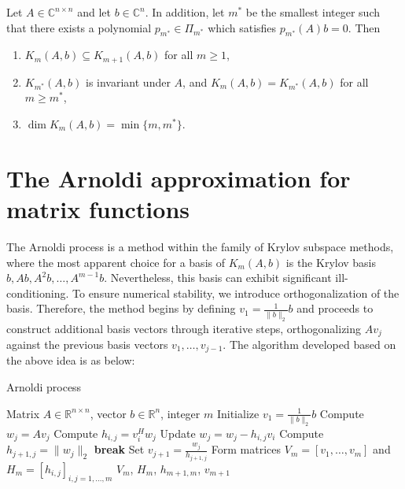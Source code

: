 \begin{remark}
    \label{rem:2.14}
    \cite{37}Let $A \in \mathbb{C}^{n \times n}$ and let $b \in \mathbb{C}^n$. In addition, let $m^*$ be the smallest integer such that there exists a polynomial $p_{m^*} \in \Pi_{m^*}$ which satisfies $p_{m^*}(A)b = 0$. Then
    \begin{enumerate}
        \item $K_m(A,b) \subseteq K_{m+1}(A,b)$ for all $m \geq 1$,
        \item $K_{m^*}(A,b)$ is invariant under $A$, and $K_m(A,b) = K_{m^*}(A,b)$ for all $m \geq m^*$,
        \item $\dim K_m(A,b) = \min\{m, m^*\}$.
    \end{enumerate}

\end{remark}

\section{The Arnoldi approximation for matrix functions}
\label{sec:arnoldi}

The Arnoldi process is a method within the family of Krylov subspace methods, where the most apparent choice for a basis of $K_m(A,b)$ is the Krylov basis $b, Ab, A^2b, \ldots, A^{m-1}b$. Nevertheless, this basis can exhibit significant ill-conditioning. To ensure numerical stability, we introduce orthogonalization of the basis. Therefore, the method begins by defining $v_1 = \frac{1}{\|b\|_2} b$ and proceeds to construct additional basis vectors through iterative steps, orthogonalizing $Av_j$ against the previous basis vectors $v_1, \ldots, v_{j-1}$. The algorithm developed based on the above idea is as below:

\begin{algorithm}[H]
    \caption{Arnoldi process \cite{38}}
    \label{alg:arnoldi}
    \begin{algorithmic}[1] %
        \REQUIRE Matrix $A \in \mathbb{R}^{n \times n}$, vector $b \in \mathbb{R}^n$, integer $m$
        \STATE Initialize $v_1 = \frac{1}{\|b\|_2} b$
            \STATE Compute $w_j = A v_j$
                \STATE Compute $h_{i,j} = v_i^H w_j$
                \STATE Update $w_j = w_j - h_{i,j} v_i$
            \ENDFOR
            \STATE Compute $h_{j+1,j} = \|w_j\|_2$
                \STATE \textbf{break}
            \ENDIF
            \STATE Set $v_{j+1} = \frac{w_j}{h_{j+1,j}}$
        \ENDFOR
        \STATE Form matrices $V_m = [v_1, \ldots, v_m]$ and $H_m = [h_{i,j}]_{i,j=1,\ldots,m}$
        \RETURN $V_m$, $H_m$, $h_{m+1,m}$, $v_{m+1}$
    \end{algorithmic}
\end{algorithm}

